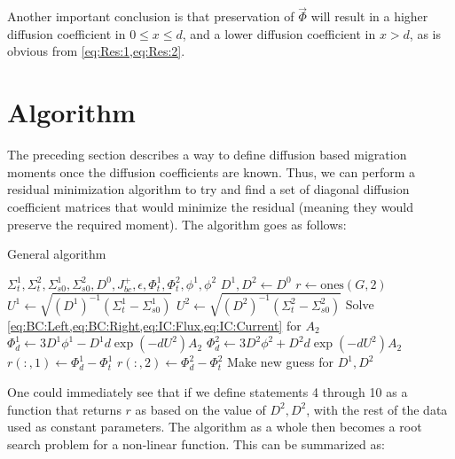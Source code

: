 \documentclass[a4paper,letterpaper,12pt,oneside,draft]{article}
\begin{document}
    Another important conclusion is that preservation of $\vec{\Phi}$ will result in a higher diffusion coefficient in $0\leq x\leq d$, and a lower diffusion coefficient in $x>d$, as is obvious from \cref{eq:Res:1,eq:Res:2}.
    
\section{Algorithm}
    The preceding section describes a way to define diffusion based migration moments once the diffusion coefficients are known.
    Thus, we can perform a residual minimization algorithm to try and find a set of diagonal diffusion coefficient matrices that would minimize the residual (meaning they would preserve the required moment).
    The algorithm goes as follows:
    \begin{algorithm}\caption{General algorithm}\label{alg:gen}
    \begin{algorithmic}[1]
        \Require $\Sigma_{t}^1,\Sigma_{t}^2,\Sigma_{s0}^1,\Sigma_{s0}^2,D^0,J^+_{bc},\epsilon, \Phi_{t}^1,\Phi_{t}^2, \phi^1,\phi^2$
        \State $D^1,D^2 \gets D^0$
        \State $r \gets \text{ones}(G,2)$
            \State $U^1 \gets \sqrt{\left(D^1\right)^{-1}\left(\Sigma_{t}^1-\Sigma_{s0}^1\right)}$
            \State $U^2 \gets \sqrt{\left(D^2\right)^{-1}\left(\Sigma_{t}^2-\Sigma_{s0}^2\right)}$
            \State Solve \cref{eq:BC:Left,eq:BC:Right,eq:IC:Flux,eq:IC:Current} for $A_2$
            \State $\Phi_{d}^1 \gets 3D^1\phi^1 - D^1d\exp(-dU^2)A_2$
            \State $\Phi_{d}^2 \gets 3D^2\phi^2 + D^2d\exp(-dU^2)A_2$
            \State $r(:,1) \gets \Phi_{d}^1 - \Phi_{t}^1$
            \State $r(:,2) \gets \Phi_{d}^2 - \Phi_{t}^2$
            \State Make new guess for $D^1,D^2$
        \EndWhile
    \end{algorithmic}
    \end{algorithm}
    
    One could immediately see that if we define statements 4 through 10 as a function that returns $r$ as based on the value of $D^2,D^2$, with the rest of the data used as constant parameters. The algorithm as a whole then becomes a root search problem for a non-linear function. This can be summarized as:
    
\end{document}
